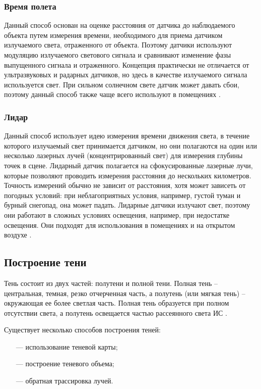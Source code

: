 \subsubsection*{Время полета}

Данный способ основан на оценке расстояния от датчика до наблюдаемого объекта путем измерения времени, необходимого для приема датчиком излучаемого света, отраженного от объекта. Поэтому датчики используют модуляцию излучаемого светового сигнала и сравнивают изменение фазы выпущенного сигнала и отраженного. Концепция практически не отличается от ультразвуковых и радарных датчиков, но здесь в качестве излучаемого сигнала используется свет. При сильном солнечном свете датчик может давать сбои, поэтому данный способ также чаще всего используют в помещениях \cite{rgbd}.

\subsubsection*{Лидар}

Данный способ использует идею измерения времени движения света, в течение которого излучаемый свет принимается датчиком, но они полагаются на один или несколько лазерных лучей (концентрированный свет) для измерения глубины точек в сцене. Лидарный датчик полагается на сфокусированные лазерные лучи, которые позволяют проводить измерения расстояния до нескольких километров. Точность измерений обычно не зависит от расстояния, хотя может зависеть от погодных условий: при неблагоприятных условия, например, густой туман и бурный снегопад, она может падать. Лидарные датчики излучают свет, поэтому они работают в сложных условиях освещения, например, при недостатке освещения. Они подходят для использования в помещениях и на открытом воздухе \cite{rgbd}.

\subsection*{Построение тени}

Тень состоит из двух частей: полутени и полной тени. Полная тень -- центральная, темная, резко отчерченная часть, а полутень (или мягкая тень) -- окружающая ее более светлая часть. Полная тень образуется при полном отсутствии света, а полутень освещается частью рассеянного света ИС \cite{rogers}.

Существует несколько способов построения теней:

\begin{itemize}
	\item[---] использование теневой карты;
	\item[---] построение теневого объема;
	\item[---] обратная трассировка лучей.
\end{itemize}

